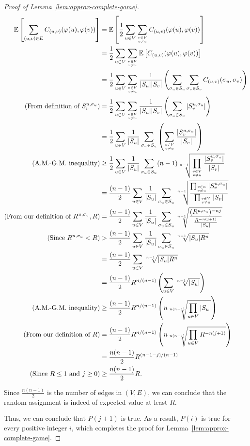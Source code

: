 \documentclass{article}
\begin{document}
\begin{proof}[Proof of Lemma~\ref{lem:approx-complete-game}]
\begin{align*}
  \mathbb{E}\left[\sum_{(u, v) \in E} C_{(u, v)}(\varphi(u), \varphi(v))\right] &= \mathbb{E}\left[\frac{1}{2}\sum_{u \in V} \sum_{v \in V \atop v \neq u} C_{(u, v)}(\varphi(u), \varphi(v))\right] \\
  &= \frac{1}{2}\sum_{u \in V} \sum_{{v \in V \atop v \neq u}} \mathbb{E}\left[C_{(u, v)}(\varphi(u), \varphi(v))\right] \\
  &= \frac{1}{2}\sum_{u \in V} \sum_{{v \in V \atop v \neq u}} \frac{1}{|S_u||S_v|} \left(\sum_{\sigma_u \in S_u} \sum_{\sigma_v \in S_v} C_{(u, v)}(\sigma_u, \sigma_v)\right) \\
  (\text{From definition of } S_v^{u, \sigma_u}) &= \frac{1}{2}\sum_{u \in V} \sum_{{v \in V \atop v \neq u}} \frac{1}{|S_u||S_v|} \left(\sum_{\sigma_u \in S_u} |S_v^{u, \sigma_u}|\right) \\
  &= \frac{1}{2} \sum_{u \in V} \frac{1}{|S_u|} \sum_{\sigma_u \in S_u} \left(\sum_{{v \in V \atop v \neq u}} \frac{|S_v^{u, \sigma_u}|}{|S_v|}\right) \\
  (\text{A.M.-G.M. inequality}) &\geq \frac{1}{2} \sum_{u \in V} \frac{1}{|S_u|} \sum_{\sigma_u \in S_u} (n - 1)\sqrt[n-1]{\prod_{{v \in V \atop v \neq u}} \frac{|S_v^{u, \sigma_u}|}{|S_v|}} \\
 &= \frac{(n - 1)}{2} \sum_{u \in V} \frac{1}{|S_u|} \sum_{\sigma_u \in S_u} \sqrt[n-1]{\frac{\prod_{{v \in n \atop v \neq u}} |S_v^{u, \sigma_u}|}{\prod_{{v \in V \atop v \neq u}} |S_v|}} \\
 (\text{From our definition of } R^{u, \sigma_u}, R) &= \frac{(n - 1)}{2} \sum_{u \in V} \frac{1}{|S_u|} \sum_{\sigma_u \in S_u} \sqrt[n-1]{\frac{(R^{u, \sigma_u})^{-nj}}{\frac{R^{-n(j + 1)}}{|S_u|}}} \\
 (\text{Since } R^{u, \sigma_u} < R) &> \frac{(n - 1)}{2} \sum_{u \in V} \frac{1}{|S_u|} \sum_{\sigma_u \in S_u} \sqrt[n-1]{|S_u|R^{n}} \\
 &= \frac{(n - 1)}{2} \sum_{u \in V} \sqrt[n-1]{|S_u|R^{n}} \\
 &= \frac{(n - 1)}{2} R^{n/(n-1)} \left(\sum_{u \in V} \sqrt[n-1]{|S_u|} \right) \\
 (\text{A.M.-G.M. inequality}) &\geq \frac{(n-1)}{2} R^{n/(n-1)} \left(n\sqrt[n(n-1)]{\prod_{u \in V} |S_u|}\right) \\
 (\text{From our definition of } R) &= \frac{(n-1)}{2} R^{n/(n-1)} \left(n\sqrt[n(n-1)]{\prod_{u \in V} R^{-n(j + 1)}}\right) \\
 &= \frac{n(n-1)}{2} R^{(n-1-j)/(n-1)} \\
 (\text{Since } R \leq 1 \text{ and } j \geq 0) &\geq \frac{n(n-1)}{2} R.
\end{align*}

Since $\frac{n(n-1)}{2}$ is the number of edges in $(V, E)$, we can conclude that the random assignment is indeed of expected value at least $R$.

Thus, we can conclude that $P(j + 1)$ is true. As a result, $P(i)$ is true for every positive integer $i$, which completes the proof for Lemma~\ref{lem:approx-complete-game}.
\end{proof}
\end{document}
